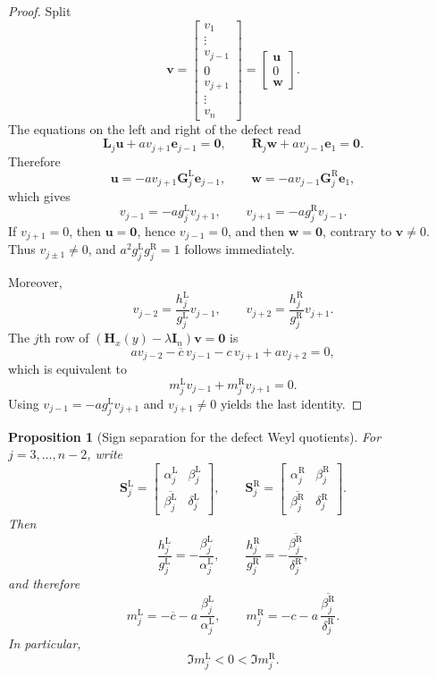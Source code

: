 \documentclass[11pt]{article}
\numberwithin{equation}{section}
\newtheorem{proposition}[theorem]{Proposition}
\begin{document}
\begin{proof}
Split
\[
\bm v=
\begin{bmatrix}
v_1\\
\vdots\\
v_{j-1}\\
0\\
v_{j+1}\\
\vdots\\
v_n
\end{bmatrix}
=
\begin{bmatrix}
\bm u\\
0\\
\bm w
\end{bmatrix}.
\]
The equations on the left and right of the defect read
\[
\mathbf L_j\bm u+av_{j+1}\bm e_{j-1}=\bm0,
\qquad
\mathbf R_j\bm w+av_{j-1}\bm e_1=\bm0.
\]
Therefore
\[
\bm u=-av_{j+1}\mathbf G_j^{\mathrm L}\bm e_{j-1},
\qquad
\bm w=-av_{j-1}\mathbf G_j^{\mathrm R}\bm e_1,
\]
which gives
\[
v_{j-1}=-ag_j^{\mathrm L}v_{j+1},
\qquad
v_{j+1}=-ag_j^{\mathrm R}v_{j-1}.
\]
If $v_{j+1}=0$, then $\bm u=\bm0$, hence $v_{j-1}=0$, and then $\bm w=\bm0$,
contrary to $\bm v\neq0$.  Thus $v_{j\pm1}\neq0$, and
$a^2g_j^{\mathrm L}g_j^{\mathrm R}=1$ follows immediately.

Moreover,
\[
v_{j-2}=\frac{h_j^{\mathrm L}}{g_j^{\mathrm L}}v_{j-1},
\qquad
v_{j+2}=\frac{h_j^{\mathrm R}}{g_j^{\mathrm R}}v_{j+1}.
\]
The $j$th row of
$(\mathbf H_x(y)-\lambda\mathbf I_n)\bm v=\bm0$ is
\[
av_{j-2}-\overline c\,v_{j-1}-c\,v_{j+1}+av_{j+2}=0,
\]
which is equivalent to
\[
m_j^{\mathrm L}v_{j-1}+m_j^{\mathrm R}v_{j+1}=0.
\]
Using $v_{j-1}=-ag_j^{\mathrm L}v_{j+1}$ and $v_{j+1}\neq0$ yields the last
identity.
\end{proof}

\begin{proposition}[Sign separation for the defect Weyl quotients]
\label{prop:sign}
For $j=3,\dots,n-2$, write
\[
\mathbf S_j^{\mathrm L}
=
\begin{bmatrix}
\alpha_j^{\mathrm L} & \beta_j^{\mathrm L}\\
\overline{\beta_j^{\mathrm L}} & \delta_j^{\mathrm L}
\end{bmatrix},
\qquad
\mathbf S_j^{\mathrm R}
=
\begin{bmatrix}
\alpha_j^{\mathrm R} & \beta_j^{\mathrm R}\\
\overline{\beta_j^{\mathrm R}} & \delta_j^{\mathrm R}
\end{bmatrix}.
\]
Then
\[
\frac{h_j^{\mathrm L}}{g_j^{\mathrm L}}
=
-\frac{\beta_j^{\mathrm L}}{\alpha_j^{\mathrm L}},
\qquad
\frac{h_j^{\mathrm R}}{g_j^{\mathrm R}}
=
-\frac{\overline{\beta_j^{\mathrm R}}}{\delta_j^{\mathrm R}},
\]
and therefore
\[
m_j^{\mathrm L}
=
-\overline c-a\,\frac{\beta_j^{\mathrm L}}{\alpha_j^{\mathrm L}},
\qquad
m_j^{\mathrm R}
=
-c-a\,\frac{\overline{\beta_j^{\mathrm R}}}{\delta_j^{\mathrm R}}.
\]
In particular,
\[
\Im m_j^{\mathrm L}<0<\Im m_j^{\mathrm R}.
\]
\end{proposition}
\end{document}
